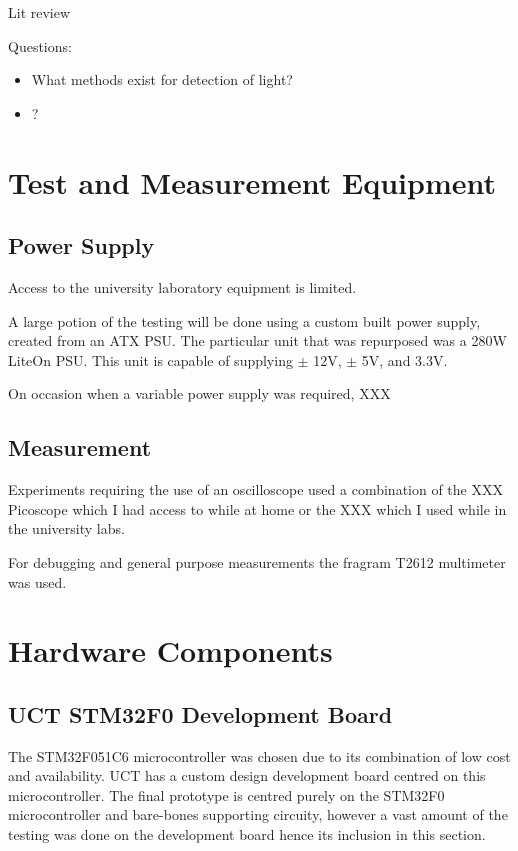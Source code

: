 Lit review

Questions:

\begin{itemize}
	\item What methods exist for detection of light?
	\item ?
\end{itemize}

\section{Test and Measurement Equipment}

\subsection{Power Supply}
Access to the university laboratory equipment is limited.

A large potion of the testing will be done using a custom built power supply, created from an ATX PSU. The particular unit that was repurposed was a 280W LiteOn PSU. This unit is capable of supplying $\pm$ 12V, $\pm$ 5V, and 3.3V.

On occasion when a variable power supply was required, XXX

\subsection{Measurement}

Experiments requiring the use of an oscilloscope used a combination of the XXX Picoscope which I had access to while at home or the XXX which I used while in the university labs.

For debugging and general purpose measurements the fragram T2612 multimeter was used.



\section{Hardware Components}

\subsection{UCT STM32F0 Development Board}
The STM32F051C6 microcontroller was chosen due to its combination of low cost and availability. UCT has a custom design development board centred on this microcontroller. The final prototype is centred purely on the STM32F0 microcontroller and bare-bones supporting circuity, however a vast amount of the testing was done on the development board hence its inclusion in this section.












